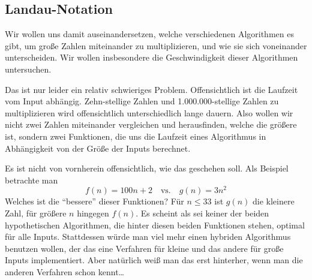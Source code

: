 
\subsection{Landau-Notation}\label{landau-notation}

\begin{remark}
    Wir wollen uns damit auseinandersetzen, welche verschiedenen Algorithmen es gibt, um große Zahlen miteinander zu multiplizieren, und wie sie sich voneinander unterscheiden. Wir wollen insbesondere die Geschwindigkeit dieser Algorithmen untersuchen.

    \medskip
    Das ist nur leider ein relativ schwieriges Problem. Offensichtlich ist die Laufzeit vom Input abhängig. Zehn-stellige Zahlen und 1.000.000-stellige Zahlen zu multiplizieren wird offensichtlich unterschiedlich lange dauern. Also wollen wir nicht zwei Zahlen miteinander vergleichen und herausfinden, welche die größere ist, sondern zwei Funktionen, die uns die Laufzeit eines Algorithmus in Abhängigkeit von der Größe der Inputs berechnet.

    \medskip
    Es ist nicht von vornherein offensichtlich, wie das geschehen soll. Als Beispiel betrachte man
    \[f(n) = 100n+2 \quad\text{vs.}\quad g(n) = 3n^2\]
    Welches ist die \enquote{bessere} dieser Funktionen? Für $n\leq 33$ ist $g(n)$ die kleinere Zahl, für größere $n$ hingegen $f(n)$. Es scheint als sei keiner der beiden hypothetischen Algorithmen, die hinter diesen beiden Funktionen stehen, optimal für alle Inputs. Stattdessen würde man viel mehr einen hybriden Algorithmus benutzen wollen, der das eine Verfahren für kleine und das andere für große Inputs implementiert. Aber natürlich weiß man das erst hinterher, wenn man die anderen Verfahren schon kennt\ldots
\end{remark}

